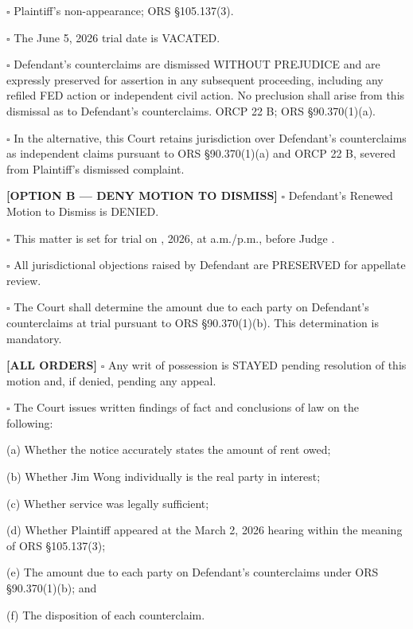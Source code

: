 \documentclass[12pt,letterpaper]{article}
\begin{document}
\ensuremath{\square} Plaintiff's non-appearance; ORS \S105.137(3).

\ensuremath{\square} The June 5, 2026 trial date is VACATED.

\ensuremath{\square} Defendant's counterclaims are dismissed WITHOUT PREJUDICE and are expressly preserved for assertion in any subsequent proceeding, including any refiled FED action or independent civil action. No preclusion shall arise from this dismissal as to Defendant's counterclaims. ORCP 22 B; ORS \S90.370(1)(a).

\ensuremath{\square} In the alternative, this Court retains jurisdiction over Defendant's counterclaims as independent claims pursuant to ORS \S90.370(1)(a) and ORCP 22 B, severed from Plaintiff's dismissed complaint.

\textbf{[OPTION B --- DENY MOTION TO DISMISS]} \ensuremath{\square} Defendant's Renewed Motion to Dismiss is DENIED.

\ensuremath{\square} This matter is set for trial on \underline{\hspace{2in}}, 2026, at \underline{\hspace{0.75in}} a.m./p.m., before Judge \underline{\hspace{2in}}.

\ensuremath{\square} All jurisdictional objections raised by Defendant are PRESERVED for appellate review.

\ensuremath{\square} The Court shall determine the amount due to each party on Defendant's counterclaims at trial pursuant to ORS \S90.370(1)(b). This determination is mandatory.

\textbf{[ALL ORDERS]} \ensuremath{\square} Any writ of possession is STAYED pending resolution of this motion and, if denied, pending any appeal.

\ensuremath{\square} The Court issues written findings of fact and conclusions of law on the following:

(a) Whether the notice accurately states the amount of rent owed;

(b) Whether Jim Wong individually is the real party in interest;

(c) Whether service was legally sufficient;

(d) Whether Plaintiff appeared at the March 2, 2026 hearing within the meaning of ORS \S105.137(3);

(e) The amount due to each party on Defendant's counterclaims under ORS \S90.370(1)(b); and

(f) The disposition of each counterclaim.
\end{document}
